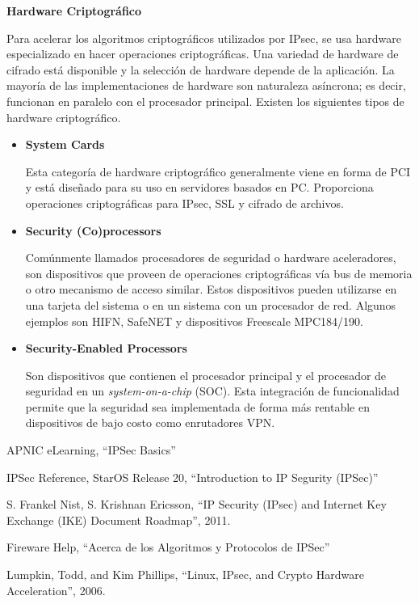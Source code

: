 \documentclass[a4paper,12pt]{article}
\begin{document}
\begin{large}
 \textbf{Hardware Criptográfico}
\end{large}

Para acelerar los algoritmos criptográficos utilizados por IPsec, se usa hardware especializado en hacer operaciones criptográficas.
Una variedad de hardware de cifrado está disponible y la selección de hardware depende de la aplicación. La mayoría de las implementaciones de hardware son
naturaleza asíncrona; es decir, funcionan en paralelo con el procesador principal. Existen los siguientes tipos de hardware criptográfico.

\begin{itemize}
 \item \textbf{System Cards} \par
 Esta categoría de hardware criptográfico generalmente viene en forma de PCI y está diseñado para su uso en servidores basados ​​en PC.
 Proporciona operaciones criptográficas para IPsec, SSL y cifrado de archivos.
 \item \textbf{Security (Co)processors} \par
 Comúnmente llamados procesadores de seguridad o hardware aceleradores, son dispositivos que proveen de operaciones criptográficas vía bus de memoria
 o otro mecanismo de acceso similar. Estos dispositivos pueden utilizarse en una tarjeta del sistema o en un sistema con un procesador de red. Algunos ejemplos son HIFN, SafeNET y dispositivos Freescale MPC184/190.
 \item \textbf{Security-Enabled Processors} \par
 Son dispositivos que contienen el procesador principal y el procesador de seguridad en un \textit{system-on-a-chip} (SOC). Esta integración de funcionalidad permite que la seguridad
 sea implementada de forma más rentable en dispositivos de bajo costo como enrutadores VPN.
\end{itemize}


\begin{thebibliography}{1}
APNIC eLearning, ``IPSec Basics''

IPSec Reference, StarOS Release 20, ``Introduction to IP Segurity (IPSec)''

S. Frankel Nist,  S. Krishnan Ericsson, ``IP Security (IPsec) and Internet Key Exchange (IKE) Document Roadmap'', 2011.

Fireware Help, ``Acerca de los Algoritmos y Protocolos de IPSec''

Lumpkin, Todd, and Kim Phillips, ``Linux, IPsec, and Crypto Hardware Acceleration'', 2006.

\end{thebibliography}
\end{document}
